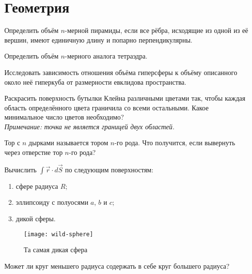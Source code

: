     \chapter{Геометрия}
    \begin{problem}
        Определить объём \(n\)-мерной пирамиды, если все рёбра, исходящие из
        одной из её вершин, имеют единичную длину и попарно перпендикулярны.
    \end{problem}
    \begin{problem}
        Определить объём \(n\)-мерного аналога тетраэдра.
    \end{problem}
    \begin{problem}
        Исследовать зависимость отношения объёма гиперсферы к объёму описанного
        около неё гиперкуба от размерности евклидова пространства.
    \end{problem}
    \begin{problem}
        Раскрасить поверхность бутылки Клейна различными цветами так, чтобы
        каждая область определённого цвета граничила со всеми остальными.
        Какое минимальное число цветов необходимо?\\
        \textit{Примечание: точка не является границей двух областей.}
    \end{problem}
    \begin{problem}
        Тор с \(n\) дырками называется тором \(n\)-го рода. Что получится, если
        вывернуть через отверстие тор \(n\)-го рода?
    \end{problem}
    \begin{problem}
        Вычислить \( \int \vec{r} \cdot d\vec{S} \) по следующим
        поверхностям:
        \begin{enumerate}
            \item сфере радиуса \( R \);
            \item эллипсоиду с полуосями \( a \), \( b \) и \( c \);
            \item дикой сферы.
        \end{enumerate}
        \begin{figure}[h]
            \centering
            \texttt{[image: wild-sphere]}
            \caption{Та самая дикая сфера}
            \label{fig:wild-sphere}
        \end{figure}
    \end{problem}
    \begin{problem}
        Может ли круг меньшего радиуса содержать в себе круг большего радиуса?
    \end{problem}
